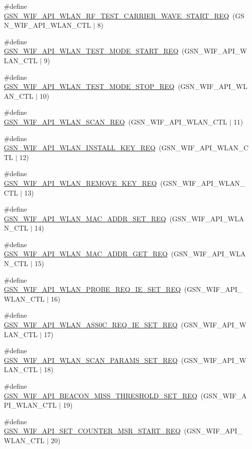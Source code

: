 \begin{DoxyCompactItemize}
\item 
\#define \hyperlink{a00606_a1957a22b168fa365aa4352fa2719cac7}{GSN\_\-WIF\_\-API\_\-WLAN\_\-RF\_\-TEST\_\-CARRIER\_\-WAVE\_\-START\_\-REQ}~(GSN\_\-WIF\_\-API\_\-WLAN\_\-CTL $|$ 8)
\item 
\#define \hyperlink{a00606_af97f692c14b16848867464de9e30345b}{GSN\_\-WIF\_\-API\_\-WLAN\_\-TEST\_\-MODE\_\-START\_\-REQ}~(GSN\_\-WIF\_\-API\_\-WLAN\_\-CTL $|$ 9)
\item 
\#define \hyperlink{a00606_a9a723d579a54011634bea28aba7c79ab}{GSN\_\-WIF\_\-API\_\-WLAN\_\-TEST\_\-MODE\_\-STOP\_\-REQ}~(GSN\_\-WIF\_\-API\_\-WLAN\_\-CTL $|$ 10)
\item 
\#define \hyperlink{a00606_a36d04dda650efd1945604cf4e91fc93a}{GSN\_\-WIF\_\-API\_\-WLAN\_\-SCAN\_\-REQ}~(GSN\_\-WIF\_\-API\_\-WLAN\_\-CTL $|$ 11)
\item 
\#define \hyperlink{a00606_a7391bce85b67103d09002373a1cd4dd4}{GSN\_\-WIF\_\-API\_\-WLAN\_\-INSTALL\_\-KEY\_\-REQ}~(GSN\_\-WIF\_\-API\_\-WLAN\_\-CTL $|$ 12)
\item 
\#define \hyperlink{a00606_ac3cc58bcd4d9098e0ac262ea82b411dd}{GSN\_\-WIF\_\-API\_\-WLAN\_\-REMOVE\_\-KEY\_\-REQ}~(GSN\_\-WIF\_\-API\_\-WLAN\_\-CTL $|$ 13)
\item 
\#define \hyperlink{a00606_a0ea898da7168e443e768b28a6fd0bbd7}{GSN\_\-WIF\_\-API\_\-WLAN\_\-MAC\_\-ADDR\_\-SET\_\-REQ}~(GSN\_\-WIF\_\-API\_\-WLAN\_\-CTL $|$ 14)
\item 
\#define \hyperlink{a00606_af67ddc2f5d26e57baaadfc05d1928cb0}{GSN\_\-WIF\_\-API\_\-WLAN\_\-MAC\_\-ADDR\_\-GET\_\-REQ}~(GSN\_\-WIF\_\-API\_\-WLAN\_\-CTL $|$ 15)
\item 
\#define \hyperlink{a00606_a5029cbbdeeb8c7da8893c2447e44a19f}{GSN\_\-WIF\_\-API\_\-WLAN\_\-PROBE\_\-REQ\_\-IE\_\-SET\_\-REQ}~(GSN\_\-WIF\_\-API\_\-WLAN\_\-CTL $|$ 16)
\item 
\#define \hyperlink{a00606_a31be24f62b1eee84f63d1d0fa328dd23}{GSN\_\-WIF\_\-API\_\-WLAN\_\-ASS0C\_\-REQ\_\-IE\_\-SET\_\-REQ}~(GSN\_\-WIF\_\-API\_\-WLAN\_\-CTL $|$ 17)
\item 
\#define \hyperlink{a00606_ae77e40031b89eb3bb5fdea3318597f19}{GSN\_\-WIF\_\-API\_\-WLAN\_\-SCAN\_\-PARAMS\_\-SET\_\-REQ}~(GSN\_\-WIF\_\-API\_\-WLAN\_\-CTL $|$ 18)
\item 
\#define \hyperlink{a00606_ae32370bb6df5ef1f64f00e2c104a8913}{GSN\_\-WIF\_\-API\_\-BEACON\_\-MISS\_\-THRESHOLD\_\-SET\_\-REQ}~(GSN\_\-WIF\_\-API\_\-WLAN\_\-CTL $|$ 19)
\item 
\#define \hyperlink{a00606_a79cd91d26d1dfdd3b3e00f8568587797}{GSN\_\-WIF\_\-API\_\-SET\_\-COUNTER\_\-MSR\_\-START\_\-REQ}~(GSN\_\-WIF\_\-API\_\-WLAN\_\-CTL $|$ 20)

\end{DoxyCompactItemize}
